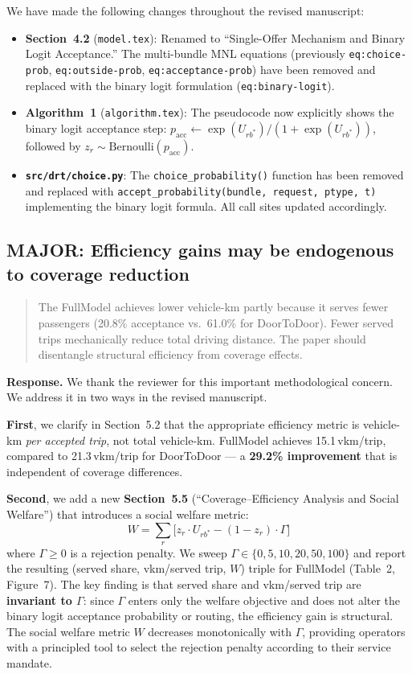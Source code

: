\documentclass[12pt]{article}
\newenvironment{revcomment}{%
  \begin{quote}\itshape
}{%
  \end{quote}
}
\begin{document}
We have made the following changes throughout the revised manuscript:
\begin{itemize}
  \item \textbf{Section~4.2} (\texttt{model.tex}): Renamed to ``Single-Offer Mechanism and Binary Logit Acceptance.'' The multi-bundle MNL equations (previously \texttt{eq:choice-prob}, \texttt{eq:outside-prob}, \texttt{eq:acceptance-prob}) have been removed and replaced with the binary logit formulation (\texttt{eq:binary-logit}).
  \item \textbf{Algorithm~1} (\texttt{algorithm.tex}): The pseudocode now explicitly shows the binary logit acceptance step: $p_{\text{acc}} \leftarrow \exp(U_{rb^*}) / (1 + \exp(U_{rb^*}))$, followed by $z_r \sim \mathrm{Bernoulli}(p_{\text{acc}})$.
  \item \textbf{\texttt{src/drt/choice.py}}: The \texttt{choice\_probability()} function has been removed and replaced with \texttt{accept\_probability(bundle, request, ptype, t)} implementing the binary logit formula. All call sites updated accordingly.
\end{itemize}

\bigskip

\subsection*{MAJOR: Efficiency gains may be endogenous to coverage reduction}

\begin{revcomment}
The FullModel achieves lower vehicle-km partly because it serves fewer passengers (20.8\% acceptance vs.\ 61.0\% for DoorToDoor). Fewer served trips mechanically reduce total driving distance. The paper should disentangle structural efficiency from coverage effects.
\end{revcomment}

\textbf{Response.} We thank the reviewer for this important methodological concern. We address it in two ways in the revised manuscript.

\textbf{First}, we clarify in Section~5.2 that the appropriate efficiency metric is vehicle-km \emph{per accepted trip}, not total vehicle-km. FullModel achieves 15.1\,vkm/trip, compared to 21.3\,vkm/trip for DoorToDoor --- a \textbf{29.2\% improvement} that is independent of coverage differences.

\textbf{Second}, we add a new \textbf{Section~5.5} (``Coverage--Efficiency Analysis and Social Welfare'') that introduces a social welfare metric:
\[
  W = \sum_r \bigl[ z_r \cdot U_{rb^*} - (1 - z_r) \cdot \Gamma \bigr]
\]
where $\Gamma \geq 0$ is a rejection penalty. We sweep $\Gamma \in \{0, 5, 10, 20, 50, 100\}$ and report the resulting (served share, vkm/served trip, $W$) triple for FullModel (Table~2, Figure~7). The key finding is that served share and vkm/served trip are \textbf{invariant to $\Gamma$}: since $\Gamma$ enters only the welfare objective and does not alter the binary logit acceptance probability or routing, the efficiency gain is structural. The social welfare metric $W$ decreases monotonically with $\Gamma$, providing operators with a principled tool to select the rejection penalty according to their service mandate.
\end{document}
